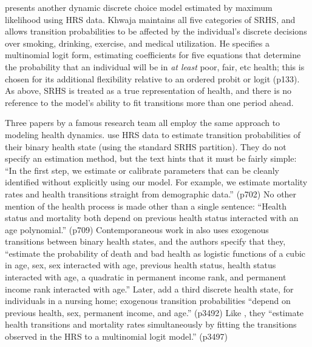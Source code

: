 \documentclass[12pt,pdftex,letterpaper]{article}
\begin{document}
\cite{Khwaja10} presents another dynamic discrete choice model estimated by maximum likelihood using HRS data.  Khwaja maintains all five categories of SRHS, and allows transition probabilities to be affected by the individual's discrete decisions over smoking, drinking, exercise, and medical utilization.  He specifies a multinomial logit form, estimating coefficients for five equations that determine the probability that an individual will be in \textit{at least} poor, fair, etc health; this is chosen for its additional flexibility relative to an ordered probit or logit (p133).  As above, SRHS is treated as a true representation of health, and there is no reference to the model's ability to fit transitions more than one period ahead.

Three papers by a famous research team all employ the same approach to modeling health dynamics.  \cite{French11} use HRS data to estimate transition probabilities of their binary health state (using the standard SRHS partition).  They do not specify an estimation method, but the text hints that it must be fairly simple: ``In the first step, we estimate or calibrate parameters that can be cleanly identified without explicitly using our model.  For example, we estimate mortality rates and health transitions straight from demographic data.'' (p702)  No other mention of the health process is made other than a single sentence: ``Health status and mortality both depend on previous health status interacted with an age polynomial.'' (p709)  Contemporaneous work in \cite{DeNardi10} also uses exogenous transitions between binary health states, and the authors specify that they, ``estimate the probability of death and bad health as logistic functions of a cubic in age, sex, sex interacted with age, previous health status, health status interacted with age, a quadratic in permanent income rank, and permanent income rank interacted with age.''  Later, \cite{DeNardi16} add a third discrete health state, for individuals in a nursing home; exogenous transition probabilities ``depend on previous health, sex, permanent income, and age.'' (p3492)  Like \cite{Khwaja10}, they ``estimate health transitions and mortality rates simultaneously by fitting the transitions observed in the HRS to a multinomial logit model.'' (p3497)
\end{document}
